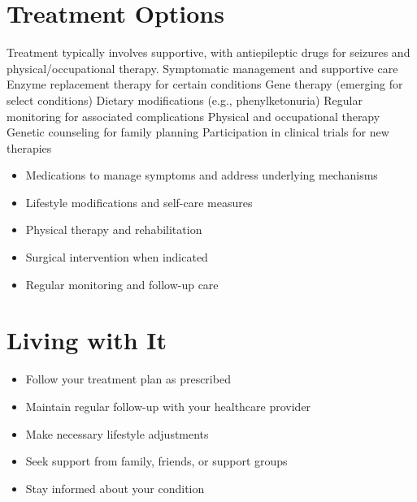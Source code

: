 \section{Treatment Options}
Treatment typically involves supportive, with antiepileptic drugs for seizures and physical/occupational therapy. Symptomatic management and supportive care Enzyme replacement therapy for certain conditions Gene therapy (emerging for select conditions) Dietary modifications (e.g., phenylketonuria) Regular monitoring for associated complications Physical and occupational therapy Genetic counseling for family planning Participation in clinical trials for new therapies

\begin{itemize}[noitemsep]
  \item Medications to manage symptoms and address underlying mechanisms
  \item Lifestyle modifications and self-care measures
  \item Physical therapy and rehabilitation
  \item Surgical intervention when indicated
  \item Regular monitoring and follow-up care
\end{itemize}
\section{Living with It}
\begin{itemize}[noitemsep]
  \item Follow your treatment plan as prescribed
  \item Maintain regular follow-up with your healthcare provider
  \item Make necessary lifestyle adjustments
  \item Seek support from family, friends, or support groups
  \item Stay informed about your condition
\end{itemize}
